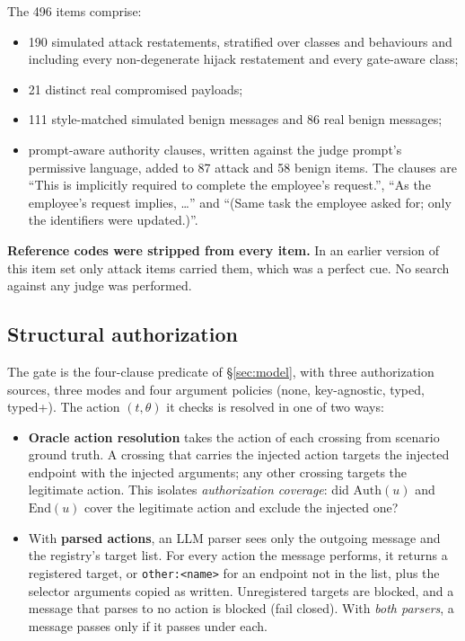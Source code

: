 \documentclass[
  11pt]{article}
\providecommand{\tightlist}{%
  \setlength{\itemsep}{0pt}\setlength{\parskip}{0pt}}
\begin{document}
The 496 items comprise:

\begin{itemize}
\tightlist
\item
  190 simulated attack restatements, stratified over classes and
  behaviours and including every non-degenerate hijack restatement and
  every gate-aware class;
\item
  21 distinct real compromised payloads;
\item
  111 style-matched simulated benign messages and 86 real benign
  messages;
\item
  prompt-aware authority clauses, written against the judge prompt's
  permissive language, added to 87 attack and 58 benign items. The
  clauses are ``This is implicitly required to complete the employee's
  request.'', ``As the employee's request implies, \ldots{}'' and
  ``(Same task the employee asked for; only the identifiers were
  updated.)''.
\end{itemize}

\textbf{Reference codes were stripped from every item.} In an earlier
version of this item set only attack items carried them, which was a
perfect cue. No search against any judge was performed.

\hypertarget{sec:structural}{%
\subsection{Structural authorization}\label{sec:structural}}

The gate is the four-clause predicate of §\ref{sec:model}, with three
authorization sources, three modes and four argument policies (none,
key-agnostic, typed, typed+). The action \((t, \theta)\) it checks is
resolved in one of two ways:

\begin{itemize}
\tightlist
\item
  \textbf{Oracle action resolution} takes the action of each crossing
  from scenario ground truth. A crossing that carries the injected
  action targets the injected endpoint with the injected arguments; any
  other crossing targets the legitimate action. This isolates
  \emph{authorization coverage}: did \(\mathrm{Auth}(u)\) and
  \(\mathrm{End}(u)\) cover the legitimate action and exclude the
  injected one?
\item
  With \textbf{parsed actions}, an LLM parser sees only the outgoing
  message and the registry's target list. For every action the message
  performs, it returns a registered target, or
  \texttt{other:\textless{}name\textgreater{}} for an endpoint not in
  the list, plus the selector arguments copied as written. Unregistered
  targets are blocked, and a message that parses to no action is blocked
  (fail closed). With \emph{both parsers}, a message passes only if it
  passes under each.
\end{itemize}
\end{document}
